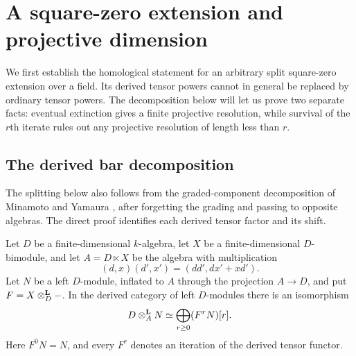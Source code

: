 \section{A square-zero extension and projective dimension}
\label{sec:square-zero}

We first establish the homological statement for an arbitrary
split square-zero extension over a field.  Its derived tensor
powers cannot in general be replaced by ordinary tensor powers.
The decomposition below will let us prove two separate facts: eventual
extinction gives a finite projective resolution, while survival of the
\(r\)th iterate rules out any projective resolution of length less than \(r\).

\subsection{The derived bar decomposition}

The splitting below also follows from the graded-component decomposition
of Minamoto and Yamaura
\cite[Lemma~4.13(4) and the proof of Theorem~4.17]{MinamotoYamaura},
after forgetting the grading and passing to opposite algebras.
The direct proof identifies each derived tensor factor and its shift.

\begin{proposition}
\label{prop:bar-splitting}
Let \(D\) be a finite-dimensional \(k\)-algebra, let \(X\) be
a finite-dimensional \(D\)-bimodule, and let
\(A=D\ltimes X\) be the algebra with multiplication
\[
(d,x)(d',x')=(dd',dx'+xd').
\]
Let \(N\) be a left \(D\)-module, inflated to \(A\) through
the projection \(A\to D\), and put \(F=X\otimes^{\mathbf L}_D-\).
In the derived category of left \(D\)-modules there is an
isomorphism
\begin{equation}
\label{eq:bar-splitting}
D\otimes^{\mathbf L}_A N
\simeq
\bigoplus_{r\ge0}(F^rN)[r].
\end{equation}
Here \(F^0N=N\), and every \(F^r\) denotes an iteration
of the derived tensor functor.
\end{proposition}

